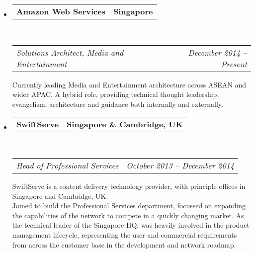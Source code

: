 \documentclass[10pt,a4paper]{article}
\makeatletter
\newcommand{\headerrow}[2]
{\begin{tabular*}{\linewidth}{l@{\extracolsep{\fill}}r}
    #1 &
    #2 \\
\end{tabular*}}
\makeatother
\begin{document}
\begin{itemize}
    \parskip=0.1em

    \item
        \headerrow
            {\textbf{Amazon Web Services}}
            {\textbf{Singapore}}
        \\
        \headerrow
            {\emph{Solutions Architect, Media and Entertainment}}
            {\emph{December 2014 -- Present}}
            
            Currently leading Media and Entertainment architecture across ASEAN and wider APAC. A hybrid role, providing technical thought leadership, evangelism, architecture and guidance both internally and externally.  
            


    \item
        \headerrow
            {\textbf{SwiftServe}}
            {\textbf{Singapore \& Cambridge, UK}}
        \\
        \headerrow
            {\emph{Head of Professional Services}}
            {\emph{October 2013 -- December 2014}}
    
            SwiftServe is a content delivery technology provider, with principle offices in Singapore and Cambridge, UK.
            \\
            Joined to build the Professional Services department, focussed on expanding the capabilities of the network to compete in a quickly changing market. As the technical leader of the Singapore HQ, was heavily involved in the product management lifecycle, representing the user and commercial requirements from across the customer base in the development and network roadmap.
            

\end{itemize}
\end{document}
